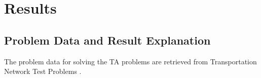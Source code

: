 \chapter{Results}\label{chap:results}

\section{Problem Data and Result Explanation}

The problem data for solving the TA problems are retrieved from Transportation Network Test Problems \citep{ProblemData}.

